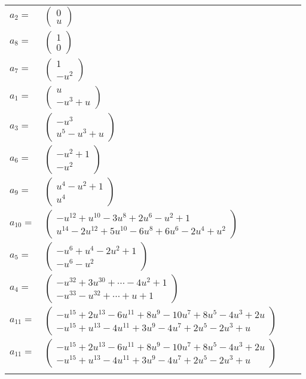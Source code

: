 \documentclass[1p]{elsarticle_modified}
\theoremstyle{definition}
\begin{document}
\begin{tabular}{m{7pt} m{180pt} m{7pt} m{180pt} }
\flushright $a_{2}=$&$\begin{pmatrix}0\\u\end{pmatrix}$ \\
\flushright $a_{8}=$&$\begin{pmatrix}1\\0\end{pmatrix}$ \\
\flushright $a_{7}=$&$\begin{pmatrix}1\\- u^2\end{pmatrix}$ \\
\flushright $a_{1}=$&$\begin{pmatrix}u\\- u^3+u\end{pmatrix}$ \\
\flushright $a_{3}=$&$\begin{pmatrix}- u^3\\u^5- u^3+u\end{pmatrix}$ \\
\flushright $a_{6}=$&$\begin{pmatrix}- u^2+1\\- u^2\end{pmatrix}$ \\
\flushright $a_{9}=$&$\begin{pmatrix}u^4- u^2+1\\u^4\end{pmatrix}$ \\
\flushright $a_{10}=$&$\begin{pmatrix}- u^{12}+u^{10}-3 u^8+2 u^6- u^2+1\\u^{14}-2 u^{12}+5 u^{10}-6 u^8+6 u^6-2 u^4+u^2\end{pmatrix}$ \\
\flushright $a_{5}=$&$\begin{pmatrix}- u^6+u^4-2 u^2+1\\- u^6- u^2\end{pmatrix}$ \\
\flushright $a_{4}=$&$\begin{pmatrix}- u^{32}+3 u^{30}+\cdots-4 u^2+1\\- u^{33}- u^{32}+\cdots+u+1\end{pmatrix}$ \\
\flushright $a_{11}=$&$\begin{pmatrix}- u^{15}+2 u^{13}-6 u^{11}+8 u^9-10 u^7+8 u^5-4 u^3+2 u\\- u^{15}+u^{13}-4 u^{11}+3 u^9-4 u^7+2 u^5-2 u^3+u\end{pmatrix}$\\ \flushright $a_{11}=$&$\begin{pmatrix}- u^{15}+2 u^{13}-6 u^{11}+8 u^9-10 u^7+8 u^5-4 u^3+2 u\\- u^{15}+u^{13}-4 u^{11}+3 u^9-4 u^7+2 u^5-2 u^3+u\end{pmatrix}$\\&\end{tabular}
\end{document}
